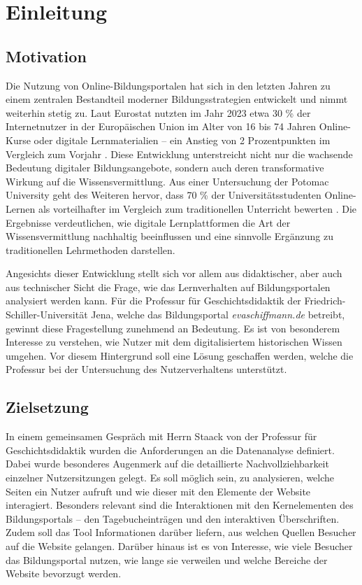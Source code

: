 \chapter{Einleitung}
\label{ch:einleitung}

\section{Motivation}
\label{sec:motivation}

Die Nutzung von Online-Bildungsportalen hat sich in den letzten Jahren zu einem zentralen Bestandteil moderner Bildungsstrategien entwickelt und nimmt weiterhin stetig zu. Laut Eurostat nutzten im Jahr 2023 etwa 30 \% der Internetnutzer in der Europäischen Union im Alter von 16 bis 74 Jahren Online-Kurse oder digitale Lernmaterialien – ein Anstieg von 2 Prozentpunkten im Vergleich zum Vorjahr \parencite{Eurostat}. Diese Entwicklung unterstreicht nicht nur die wachsende Bedeutung digitaler Bildungsangebote, sondern auch deren transformative Wirkung auf die Wissensvermittlung. Aus einer Untersuchung der Potomac University geht des Weiteren hervor, dass 70 \% der Universitätsstudenten Online-Lernen als vorteilhafter im Vergleich zum traditionellen Unterricht bewerten \parencite{Potomac}. Die Ergebnisse verdeutlichen, wie digitale Lernplattformen die Art der Wissensvermittlung nachhaltig beeinflussen und eine sinnvolle Ergänzung zu traditionellen Lehrmethoden darstellen.

Angesichts dieser Entwicklung stellt sich vor allem aus didaktischer, aber auch aus technischer Sicht die Frage, wie das Lernverhalten auf Bildungsportalen analysiert werden kann. Für die Professur für Geschichtsdidaktik der Friedrich-Schiller-Universität Jena, welche das Bildungsportal \textit{evaschiffmann.de} betreibt, gewinnt diese Fragestellung zunehmend an Bedeutung. Es ist von besonderem Interesse zu verstehen, wie Nutzer mit dem digitalisiertem historischen Wissen umgehen. Vor diesem Hintergrund soll eine Lösung geschaffen werden, welche die Professur bei der Untersuchung des Nutzerverhaltens unterstützt.

\section{Zielsetzung}
\label{sec:zielsetzung}

In einem gemeinsamen Gespräch mit Herrn Staack von der Professur für Geschichtsdidaktik wurden die Anforderungen an die Datenanalyse definiert. Dabei wurde besonderes Augenmerk auf die detaillierte Nachvollziehbarkeit einzelner Nutzersitzungen gelegt. Es soll möglich sein, zu analysieren, welche Seiten ein Nutzer aufruft und wie dieser mit den Elemente der Website interagiert. Besonders relevant sind die Interaktionen mit den Kernelementen des Bildungsportals – den Tagebucheinträgen und den interaktiven Überschriften. Zudem soll das Tool Informationen darüber liefern, aus welchen Quellen Besucher auf die Website gelangen. Darüber hinaus ist es von Interesse, wie viele Besucher das Bildungsportal nutzen, wie lange sie verweilen und welche Bereiche der Website bevorzugt werden.


